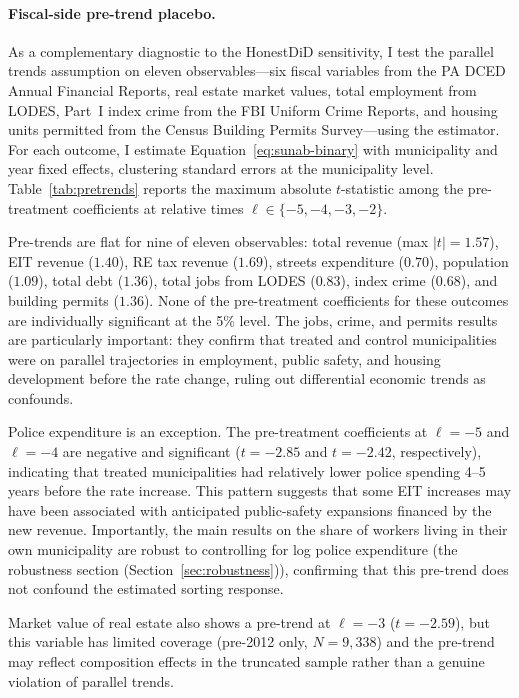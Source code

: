 \documentclass[12pt]{article}
\begin{document}
\paragraph{Fiscal-side pre-trend placebo.}
As a complementary diagnostic to the HonestDiD sensitivity, I test
the parallel trends assumption on eleven observables---six fiscal
variables from the PA DCED Annual Financial Reports, real estate market
values, total employment from LODES, Part~I index crime from the FBI
Uniform Crime Reports, and housing units permitted from the Census
Building Permits Survey---using the \citet{sunab2021} estimator.
For each outcome, I estimate Equation~\ref{eq:sunab-binary} with municipality
and year fixed effects, clustering standard errors at the municipality
level. Table~\ref{tab:pretrends} reports the maximum absolute
$t$-statistic among the pre-treatment coefficients at relative times
$\ell \in \{-5, -4, -3, -2\}$.

Pre-trends are flat for nine of eleven observables: total revenue
(max $|t| = 1.57$), EIT revenue ($1.40$), RE tax revenue ($1.69$),
streets expenditure ($0.70$), population ($1.09$), total debt ($1.36$),
total jobs from LODES ($0.83$), index crime ($0.68$), and building
permits ($1.36$). None of the pre-treatment coefficients for these
outcomes are individually significant at the 5\% level.
The jobs, crime, and permits results are particularly important: they
confirm that treated and control municipalities were on parallel
trajectories in employment, public safety, and housing development
before the rate change, ruling out differential economic trends as
confounds.

Police expenditure is an exception. The pre-treatment coefficients at
$\ell = -5$ and $\ell = -4$ are negative and significant ($t = -2.85$ and
$t = -2.42$, respectively), indicating that treated municipalities had
relatively lower police spending 4--5 years before the rate increase.
This pattern suggests that some EIT increases may have been associated with
anticipated public-safety expansions financed by the new revenue. Importantly,
the main results on the share of workers living in their own municipality are robust to controlling for
log police expenditure (the robustness section (Section~\ref{sec:robustness})), confirming that this
pre-trend does not confound the estimated sorting response.

Market value of real estate also shows a pre-trend at $\ell = -3$
($t = -2.59$), but this variable has limited coverage (pre-2012 only,
$N = 9{,}338$) and the pre-trend may reflect composition effects in the
truncated sample rather than a genuine violation of parallel trends.
\end{document}
